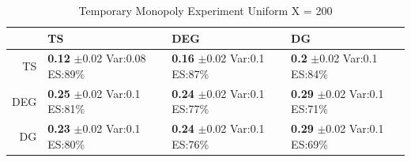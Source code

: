 \documentclass[11pt,letterpaper]{article}
\begin{document}
\begin{table}[H]
\centering
\caption{Temporary Monopoly Experiment Uniform X = 200} 
\begin{tabular}{rlll}
  \hline
 & TS & DEG &  DG \\ 
  \hline
TS & \makecell{\textbf{0.12} $\pm$0.02\\Var:0.08\\ES:89\%} & \makecell{\textbf{0.16} $\pm$0.02\\Var:0.1\\ES:87\%} & \makecell{\textbf{0.2} $\pm$0.02\\Var:0.1\\ES:84\%} \\ 
  DEG & \makecell{\textbf{0.25} $\pm$0.02\\Var:0.1\\ES:81\%} & \makecell{\textbf{0.24} $\pm$0.02\\Var:0.1\\ES:77\%} & \makecell{\textbf{0.29} $\pm$0.02\\Var:0.1\\ES:71\%} \\ 
   DG & \makecell{\textbf{0.23} $\pm$0.02\\Var:0.1\\ES:80\%} & \makecell{\textbf{0.24} $\pm$0.02\\Var:0.1\\ES:76\%} & \makecell{\textbf{0.29} $\pm$0.02\\Var:0.1\\ES:69\%} \\ 
   \hline
\end{tabular}
\end{table}
\end{document}

